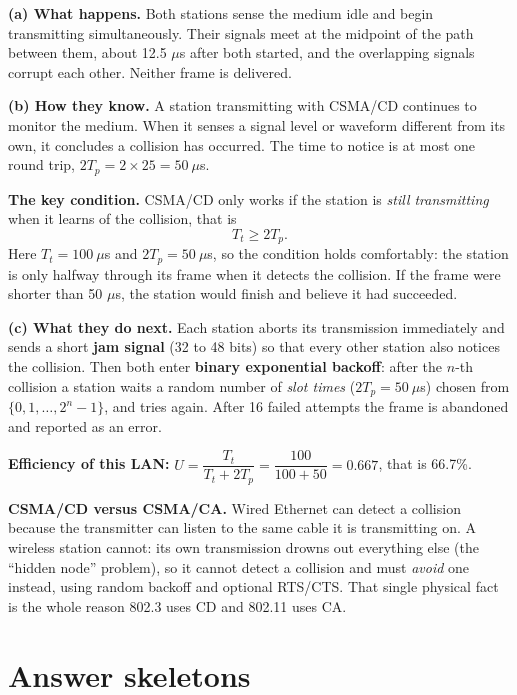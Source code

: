 \documentclass[11pt,a4paper]{article}
\begin{document}
\begin{solbox}
\textbf{(a) What happens.} Both stations sense the medium idle and begin transmitting simultaneously. Their signals meet at the midpoint of the path between them, about 12.5 $\mu$s after both started, and the overlapping signals corrupt each other. Neither frame is delivered.

\textbf{(b) How they know.} A station transmitting with CSMA/CD continues to monitor the medium. When it senses a signal level or waveform different from its own, it concludes a collision has occurred. The time to notice is at most one round trip, $2T_p = 2 \times 25 = 50\ \mu$s.

\textbf{The key condition.} CSMA/CD only works if the station is \emph{still transmitting} when it learns of the collision, that is
\[
T_t \ge 2T_p.
\]
Here $T_t = 100\ \mu$s and $2T_p = 50\ \mu$s, so the condition holds comfortably: the station is only halfway through its frame when it detects the collision. If the frame were shorter than 50 $\mu$s, the station would finish and believe it had succeeded.

\textbf{(c) What they do next.} Each station aborts its transmission immediately and sends a short \textbf{jam signal} (32 to 48 bits) so that every other station also notices the collision. Then both enter \textbf{binary exponential backoff}: after the $n$-th collision a station waits a random number of \emph{slot times} ($2T_p = 50\ \mu$s) chosen from $\{0, 1, \dots, 2^n - 1\}$, and tries again. After 16 failed attempts the frame is abandoned and reported as an error.

\textbf{Efficiency of this LAN:} $U = \dfrac{T_t}{T_t + 2T_p} = \dfrac{100}{100+50} = 0.667$, that is 66.7\%.
\end{solbox}

\begin{rememberbox}
\textbf{CSMA/CD versus CSMA/CA.} Wired Ethernet can detect a collision because the transmitter can listen to the same cable it is transmitting on. A wireless station cannot: its own transmission drowns out everything else (the ``hidden node'' problem), so it cannot detect a collision and must \emph{avoid} one instead, using random backoff and optional RTS/CTS. That single physical fact is the whole reason 802.3 uses CD and 802.11 uses CA.
\end{rememberbox}

\section{Answer skeletons}
\end{document}
